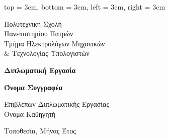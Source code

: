\newgeometry
{
    top = 3cm,
    bottom = 3cm,
    left = 3cm,
    right = 3cm
}

\begin{otherlanguage}{greek}

\begin{center}

{\large Πολυτεχνική Σχολή\\
Πανεπιστημίου Πατρών\\[0.5cm]
Τμήμα Ηλεκτρολόγων Μηχανικών\\
\& Τεχνολογίας Υπολογιστών}

\vspace{2cm}

{\large \textbf{Διπλωματική Εργασία}}

\vspace{2cm}

\HellenicThesisTitle

\vspace{2cm}

{\large \textbf{Όνομα Συγγραφέα}}

\vspace{2cm}


\vspace{2cm}

{\large Επιβλέπων Διπλωματικής Εργασίας\\
Όνομα Καθηγητή}

\vspace{2cm}

{\large Τοποθεσία, Μήνας Έτος}

\end{center}

\end{otherlanguage}

\restoregeometry